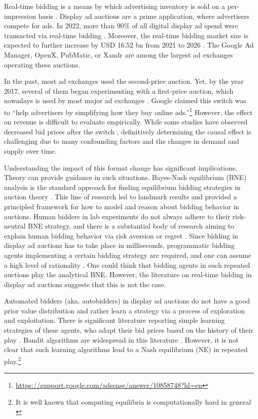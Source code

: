 \documentclass{article}
\begin{document}
Real-time bidding is a means by which advertising inventory is sold on a per-impression basis \citep{choi2020online}. Display ad auctions are a prime application, where advertisers compete for ads. In 2022, more than 90\% of all digital display ad spend were transacted via real-time bidding \citep{yuen22}. Moreover, the real-time bidding market size is expected to further increase by USD 16.52 bn from 2021 to 2026 \citep{tunuguntla2021near}. The Google Ad Manager, OpenX, PubMatic, or Xandr are among the largest ad exchanges operating these auctions. 

In the past, most ad exchanges used the second-price auction. Yet, by the year 2017, several of them began experimenting with a first-price auction, which nowadays is used by most major ad exchanges \citep{despotakis2021first}. Google claimed this switch was to ``help advertisers by simplifying how they buy online ads.''\footnote{\url{https://support.google.com/adsense/answer/10858748?hl=en}} However, the effect on revenue is difficult to evaluate empirically. While some studies have observed decreased bid prices after the switch \citep{alcobendas2021adjustment}, definitively determining the causal effect is challenging due to many confounding factors and the changes in demand and supply over time.

Understanding the impact of this format change has significant implications. Theory can provide guidance in such situations. Bayes-Nash equilibrium (BNE) analysis is the standard approach for finding equilibrium bidding strategies in auction theory  \citep{krishna2009auction}. This line of research led to landmark results and provided a principled framework for how to model and reason about bidding behavior in auctions. Human bidders in lab experiments do not always adhere to their risk-neutral BNE strategy, and there is a substantial body of research aiming to explain human bidding behavior via risk aversion or regret \citep{kagel2020handbook}. Since bidding in display ad auctions has to take place in milliseconds, programmatic bidding agents implementing a certain bidding strategy are required, and one can assume a high level of rationality \citep{choi2020online}. One could think that bidding agents in such repeated auctions play the analytical BNE. 
However, the literature on real-time bidding in display ad auctions suggests that this is not the case. 

Automated bidders (aka. autobidders) in display ad auctions do not have a good prior value distribution and rather learn a strategy via a process of exploration and exploitation. There is significant literature reporting simple learning strategies of these agents, who adapt their bid prices based on the history of their play \citep{cai2017real, jin2018real, zhao2018deep, cheng2019extensible}. Bandit algorithms are widespread in this literature \citep{he2013online, tunuguntla2021near, jauvion2018optimization, tilli2021multi, kolumbus2022auctions}. However, it is not clear that such learning algorithms lead to a Nash equilibrium (NE) in repeated play.\footnote{It is well known that computing equilibria is computationally hard in general \citep{daskalakis2009complexity}} 
\end{document}
